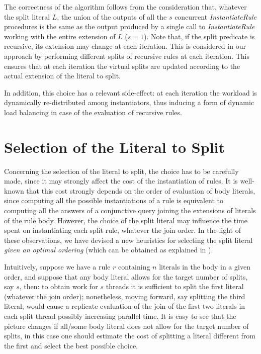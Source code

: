 \documentclass[preprint]{tlp}
\begin{document}
The correctness of the algorithm follows from the consideration
that, whatever the split literal $L$, the union of the outputs of
all the $s$ concurrent {\em InstantiateRule} procedures is the same
as the output produced by a single call to {\em InstantiateRule}
working with the entire extension of $L$ ($s=1$). Note that, if the
split predicate is recursive, its extension may change at each
iteration. This is considered in our approach by performing
different splits of recursive rules at each iteration. This ensures
that at each iteration the virtual splits are updated according to
the actual extension of the literal to split.


In addition, this choice has a relevant side-effect: at each
iteration the workload is dynamically re-distributed among
instantiators, thus inducing a form of dynamic load balancing
in case of the evaluation of recursive rules.

\section{Selection of the Literal to Split}\label{sec:splitlit}

Concerning the selection of the literal to split, the choice has to
be carefully made, since it may strongly affect the cost of the
instantiation of rules. It is well-known that this cost strongly depends on
the order of evaluation of body literals, since computing all the possible
instantiations of a rule is equivalent to computing all the answers
of a conjunctive query joining the extensions of literals of the
rule body. However, the choice of the split literal may
influence the time spent on instantiating each split rule, whatever the join order.
In the light of these observations, we have devised a new heuristics for selecting
the split literal {\em given an optimal ordering} (which can be obtained as explained in \cite{leon-etal-2001a}).

Intuitively, suppose we have a rule $r$ containing $n$ literals in
the body in a given order, and suppose that any body literal allows
for the target number of splits, say $s$, then: to obtain work for
$s$ threads it is sufficient to split the first literal (whatever
the join order); nonetheless, moving forward, say splitting the
third literal, would cause a replicate evaluation of the join of the
first two literals in each split thread possibly increasing parallel
time. It is easy to see that the picture changes if  all/some body
literal does not allow for the target number of splits, in this case
one should estimate the cost of splitting a literal different from
the first and select the best possible choice.
\end{document}
